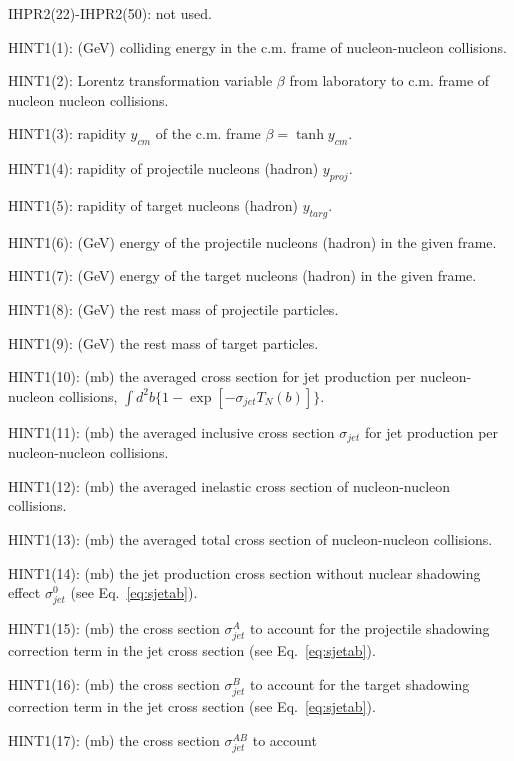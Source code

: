 \begin{description}
\item{}IHPR2(22)-IHPR2(50): not used.
\item{}HINT1(1): (GeV) colliding energy in the c.m. frame of nucleon-nucleon
                collisions.
\item{}HINT1(2): Lorentz transformation variable $\beta$ from laboratory
                to c.m.  frame of nucleon nucleon collisions.
\item{}HINT1(3): rapidity $y_{cm}$ of the c.m. frame 
                $\beta=\tanh y_{cm}$.
\item{}HINT1(4): rapidity of projectile nucleons (hadron) $y_{proj}$.
\item{}HINT1(5): rapidity of target nucleons (hadron) $y_{targ}$.
\item{}HINT1(6): (GeV) energy of the projectile nucleons (hadron) in the 
                given frame.
\item{}HINT1(7): (GeV) energy of the target nucleons (hadron) in the 
                given frame.
\item{}HINT1(8): (GeV) the rest mass of projectile particles.
\item{}HINT1(9): (GeV) the rest mass of target particles.
\item{}HINT1(10): (mb) the averaged cross section for jet production
                per nucleon-nucleon collisions,
                $\int d^2b\{1-\exp[-\sigma_{jet}T_N(b)]\}$.
\item{}HINT1(11): (mb) the averaged inclusive cross section $\sigma_{jet}$
                for jet production per nucleon-nucleon collisions.
\item{}HINT1(12): (mb) the averaged inelastic cross section of 
                nucleon-nucleon collisions.
\item{}HINT1(13): (mb) the averaged total cross section of nucleon-nucleon
                collisions.
\item{}HINT1(14): (mb) the jet production cross section without nuclear
                shadowing effect $\sigma_{jet}^0$ (see Eq.~\ref{eq:sjetab}).
\item{}HINT1(15): (mb) the cross section $\sigma_{jet}^A$ to account for 
                the projectile shadowing correction term in the jet cross 
                section (see Eq.~\ref{eq:sjetab}).
\item{}HINT1(16): (mb) the cross section $\sigma_{jet}^B$ to account for 
                the target shadowing correction term in the jet cross 
                section (see Eq.~\ref{eq:sjetab}).
\item{}HINT1(17): (mb) the cross section $\sigma_{jet}^{AB}$ to account 

\end{description}
